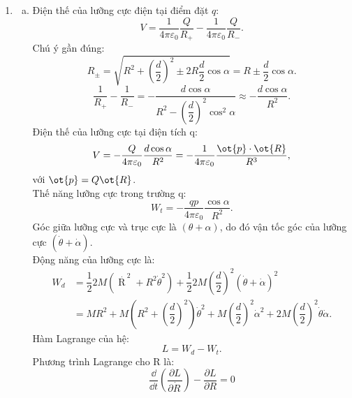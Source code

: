 \begin{vd}
\begin{enumerate}[1)]
\begin{enumerate}[a)]
        \end{enumerate}
    \end{enumerate}
\end{vd}

\begin{loigiai}
    \begin{enumerate}[1)]
        \item \begin{enumerate}[a)]
            \item Điện thế của lưỡng cực điện tại điểm đặt $q$:
            \[{V}=\dfrac{1}{4\pi {{\varepsilon }_{0}}}\dfrac{{Q}}{{{{R}}_{+}}}-\dfrac{1}{4\pi {{\varepsilon }_{0}}}\dfrac{{Q}}{{{{R}}_{-}}}.\]
            Chú ý gần đúng:
            \[{{{R}}_{\pm }}=\sqrt{{{{R}}^{2}}+{{\left( \dfrac{{d}}{2} \right)}^{2}}\pm 2{R}\dfrac{{d}}{2}\cos \alpha }={R}\pm \dfrac{{d}}{2}\cos \alpha .\]
            \[\dfrac{1}{{{{R}}_{+}}}-\dfrac{1}{{{{R}}_{-}}}=-\dfrac{{d}\cos \alpha }{{{{R}}^{2}}-{{\left( \dfrac{{d}}{2} \right)}^{2}}{{\cos }^{2}}\alpha }\approx -\dfrac{{d}\cos \alpha }{{{{R}}^{2}}}.\]
            Điện thế của lưỡng cực tại điện tích q: \[{V}=-\dfrac{{Q}}{4\pi {{\varepsilon }_{0}}}\dfrac{{d}\cos \alpha }{{{{R}}^{2}}}=-\dfrac{1}{4\pi {{\varepsilon }_{0}}}\dfrac{\ot{{p}}\cdot \ot{{R}}}{{{{R}}^{3}}},\]
            với $\ot{{p}}={Q}\ot{{R}}$.
            \\Thế năng lưỡng cực trong trường q: \[{{W}_{t}}=-\dfrac{qp}{4\pi {{\varepsilon }_{0}}}\dfrac{\cos \alpha }{{{R}^{2}}}.\]
            Góc giữa lưỡng cực và trục cực là $(\theta +\alpha )$, do đó vận tốc góc của lưỡng cực $(\dot{\theta }+\dot{\alpha })$. 
            \\Động năng của lưỡng cực là:
            \[\begin{aligned}
                 {{{W}}_{{d}}}&=\dfrac{1}{2}2{M}\left( {{\overset{.}{\mathop{{R}}}\,}^{2}}+{{{R}}^{2}}{{{\dot{\theta }}}^{2}} \right)+\dfrac{1}{2}2{M}{{\left( \dfrac{{d}}{2} \right)}^{2}}{{(\dot{\theta }+\dot{\alpha })}^{2}}\\
                &={M}{{{R}}^{2}}+{M}\left( {{{R}}^{2}}+{{\left( \dfrac{{d}}{2} \right)}^{2}} \right){{\dot{\theta }}^{2}}+{M}{{\left( \dfrac{{d}}{2} \right)}^{2}}{{\dot{\alpha }}^{2}}+2{M}{{\left( \dfrac{{d}}{2} \right)}^{2}}\dot{\theta }\dot{\alpha }.
            \end{aligned}
           \]
            Hàm Lagrange của hệ: \[{L}={{{W}}_{{d}}}-{{{W}}_{{t}}}.\]
            Phương trình Lagrange cho R là:
            \[\dfrac{{\dd}}{{\dd t}}\left( \dfrac{\partial {L}}{\partial {\dot{{R}}}\,} \right)-\dfrac{\partial {L}}{\partial {R}}=0\]

\end{enumerate}
\end{enumerate}
\end{loigiai}
